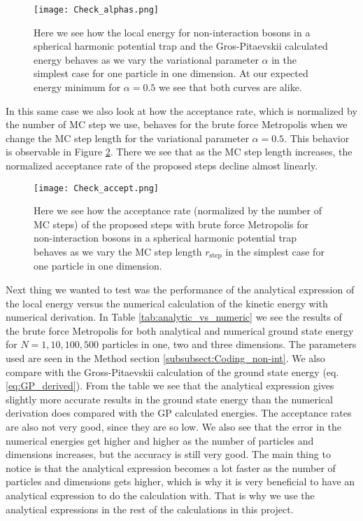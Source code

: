 \documentclass[12pt,a4paper,english]{article}
\begin{document}
\begin{figure}[htbp!]
	\centering\texttt{[image: Check\_alphas.png]}
	\caption{Here we see how the local energy for non-interaction bosons in a spherical harmonic potential trap and the Gros-Pitaevskii calculated energy behaves as we vary the variational parameter $\alpha$ in the simplest case for one particle in one dimension. At our expected energy minimum for $\alpha=0.5$ we see that both curves are alike. \label{fig:check_alphas}}
\end{figure} 

In this same case we also look at how the acceptance rate, which is normalized by the number of MC step we use, behaves for the brute force Metropolis when we change the MC step length for the variational parameter $\alpha=0.5$. This behavior is observable in Figure \ref{fig:check_accept}. There we see that as the MC step length increases, the normalized acceptance rate of the proposed steps decline almost linearly.

\begin{figure}[htbp!]
	\centering\texttt{[image: Check\_accept.png]}
	\caption{Here we see how the acceptance rate (normalized by the number of MC steps) of the proposed steps with brute force Metropolis for non-interaction bosons in a spherical harmonic potential trap behaves as we vary the MC step length $r_{\text{step}}$ in the simplest case for one particle in one dimension. \label{fig:check_accept}}
\end{figure} 

Next thing we wanted to test was the performance of the analytical expression of the local energy versus the numerical calculation of the kinetic energy with numerical derivation. In Table \ref{tab:analytic_vs_numeric} we see the results of the brute force Metropolis for both analytical and numerical ground state energy for $N=1,10,100,500$ particles in one, two and three dimensions. The parameters used are seen in the Method section \ref{subsubsect:Coding_non-int}. We also compare with the Gross-Pitaevskii calculation of the ground state energy (eq. \ref{eq:GP_derived}). From the table we see that the analytical expression gives slightly more accurate results in the ground state energy than the numerical derivation does compared with the GP calculated energies. The acceptance rates are also not very good, since they are so low. We also see that the error in the numerical energies get higher and higher as the number of particles and dimensions increases, but the accuracy is still very good. The main thing to notice is that the analytical expression becomes a lot faster as the number of particles and dimensions gets higher, which is why it is very beneficial to have an analytical expression to do the calculation with. That is why we use the analytical expressions in the rest of the calculations in this project.
\end{document}
